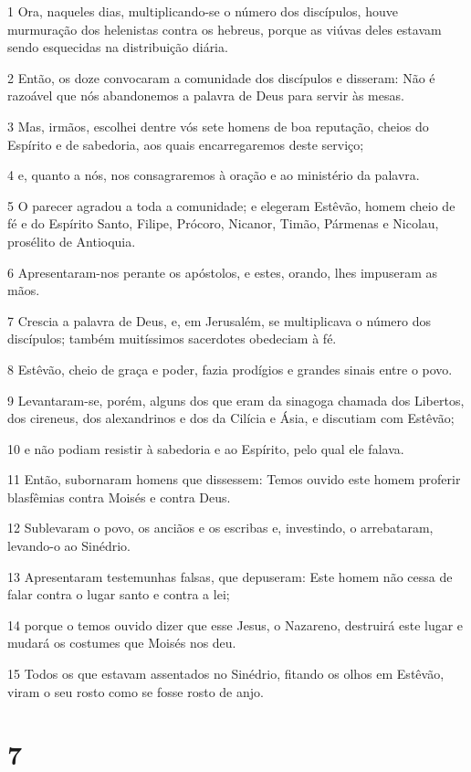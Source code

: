 \par 1 Ora, naqueles dias, multiplicando-se o número dos discípulos, houve murmuração dos helenistas contra os hebreus, porque as viúvas deles estavam sendo esquecidas na distribuição diária.
\par 2 Então, os doze convocaram a comunidade dos discípulos e disseram: Não é razoável que nós abandonemos a palavra de Deus para servir às mesas.
\par 3 Mas, irmãos, escolhei dentre vós sete homens de boa reputação, cheios do Espírito e de sabedoria, aos quais encarregaremos deste serviço;
\par 4 e, quanto a nós, nos consagraremos à oração e ao ministério da palavra.
\par 5 O parecer agradou a toda a comunidade; e elegeram Estêvão, homem cheio de fé e do Espírito Santo, Filipe, Prócoro, Nicanor, Timão, Pármenas e Nicolau, prosélito de Antioquia.
\par 6 Apresentaram-nos perante os apóstolos, e estes, orando, lhes impuseram as mãos.
\par 7 Crescia a palavra de Deus, e, em Jerusalém, se multiplicava o número dos discípulos; também muitíssimos sacerdotes obedeciam à fé.
\par 8 Estêvão, cheio de graça e poder, fazia prodígios e grandes sinais entre o povo.
\par 9 Levantaram-se, porém, alguns dos que eram da sinagoga chamada dos Libertos, dos cireneus, dos alexandrinos e dos da Cilícia e Ásia, e discutiam com Estêvão;
\par 10 e não podiam resistir à sabedoria e ao Espírito, pelo qual ele falava.
\par 11 Então, subornaram homens que dissessem: Temos ouvido este homem proferir blasfêmias contra Moisés e contra Deus.
\par 12 Sublevaram o povo, os anciãos e os escribas e, investindo, o arrebataram, levando-o ao Sinédrio.
\par 13 Apresentaram testemunhas falsas, que depuseram: Este homem não cessa de falar contra o lugar santo e contra a lei;
\par 14 porque o temos ouvido dizer que esse Jesus, o Nazareno, destruirá este lugar e mudará os costumes que Moisés nos deu.
\par 15 Todos os que estavam assentados no Sinédrio, fitando os olhos em Estêvão, viram o seu rosto como se fosse rosto de anjo.

\chapter{7}

